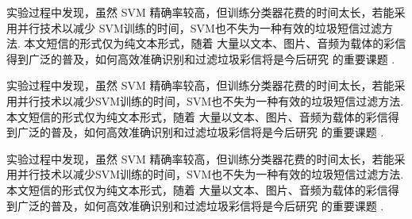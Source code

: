 \begin{con}
    实验过程中发现，虽然 SVM 精确率较高，但训练分类器花费的时间太长，若能采用并行技术以减少
    SVM训练的时间，SVM也不失为一种有效的垃圾短信过滤方法. 本文短信的形式仅为纯文本形式，随着 大量以文本、图片、音频为载体的彩信得到广泛的普及，如何高效准确识别和过滤垃圾彩信将是今后研究 的重要课题 .

    实验过程中发现，虽然 SVM 精确率较高，但训练分类器花费的时间太长，若能采用并行技术以减少SVM训练的时间，SVM也不失为一种有效的垃圾短信过滤方法. 本文短信的形式仅为纯文本形式，随着 大量以文本、图片、音频为载体的彩信得到广泛的普及，如何高效准确识别和过滤垃圾彩信将是今后研究 的重要课题 .

    实验过程中发现，虽然 SVM 精确率较高，但训练分类器花费的时间太长，若能采用并行技术以减少SVM训练的时间，SVM也不失为一种有效的垃圾短信过滤方法. 本文短信的形式仅为纯文本形式，随着 大量以文本、图片、音频为载体的彩信得到广泛的普及，如何高效准确识别和过滤垃圾彩信将是今后研究 的重要课题 .
\end{con}